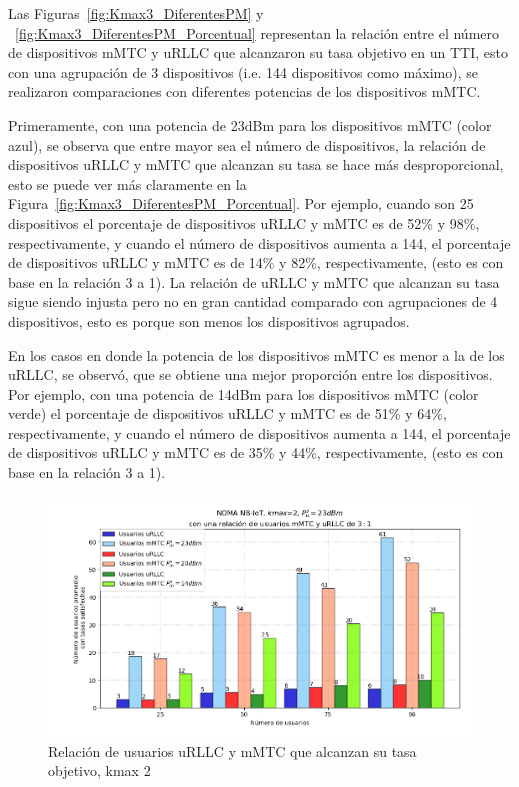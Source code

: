 Las Figuras~\ref{fig:Kmax3_DiferentesPM} y ~\ref{fig:Kmax3_DiferentesPM_Porcentual} representan la relación entre el número de dispositivos mMTC y uRLLC que alcanzaron su tasa objetivo en un TTI, esto con una agrupación de 3 dispositivos (i.e. 144 dispositivos como máximo), se realizaron comparaciones con diferentes potencias de los dispositivos mMTC.\newline

Primeramente, con una potencia de 23dBm para los dispositivos mMTC (color azul), se observa que entre mayor sea el número de dispositivos, la relación de dispositivos uRLLC y mMTC que alcanzan su tasa se hace más desproporcional, esto se puede ver más claramente en la Figura~\ref{fig:Kmax3_DiferentesPM_Porcentual}. Por ejemplo, cuando son 25 dispositivos el porcentaje de dispositivos uRLLC y mMTC es de 52\% y 98\%, respectivamente, y cuando el número de dispositivos aumenta a 144, el porcentaje de dispositivos uRLLC y mMTC es de 14\% y 82\%, respectivamente, (esto es con base en la relación 3 a 1). La relación de uRLLC y mMTC que alcanzan su tasa sigue siendo injusta pero no en gran cantidad comparado con agrupaciones de 4 dispositivos, esto es porque son menos los dispositivos agrupados.\newline

En los casos en donde la potencia de los dispositivos mMTC es menor a la de los uRLLC, se observó, que se obtiene una mejor proporción entre los dispositivos. Por ejemplo, con una potencia de 14dBm para los dispositivos mMTC (color verde) el porcentaje de dispositivos uRLLC y mMTC es de 51\% y 64\%, respectivamente, y cuando el número de dispositivos aumenta a 144, el porcentaje de dispositivos uRLLC y mMTC es de 35\% y 44\%, respectivamente, (esto es con base en la relación 3 a 1). \newline

\break

\begin{figure}[th]
    \centering
    \includegraphics[scale=.6]{Figures/ResultadosNOMA/Kmax2_DiferentesPM.png}
    \decoRule
    \caption[Relación de usuarios uRLLC y mMTC que alcanzan su tasa objetivo, kmax 2]{Relación de usuarios uRLLC y mMTC que alcanzan su tasa objetivo, kmax 2}
    \label{fig:Kmax2_DiferentesPM}
\end{figure}

